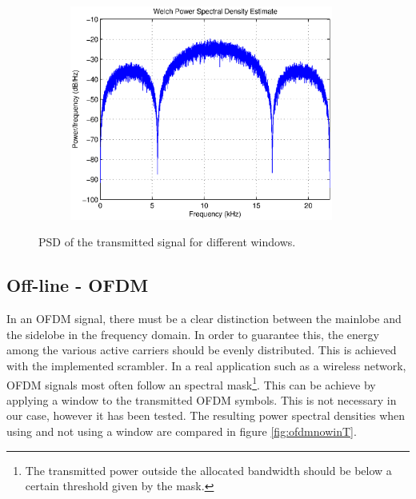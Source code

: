 \documentclass[12pt,a4paper,openright]{report}
\begin{document}
\begin{figure}[H]
\begin{subfigure}[H]{0.33\textwidth}
	    \includegraphics[width=0.95\textwidth]{psdrect.eps}
	    \label{fig:rect}
	    \end{subfigure}
	    \caption[Complex Baseband Pulse Shaping]{PSD of the transmitted signal for different windows.}
	\end{figure}

\subsection{Off-line - OFDM}

In an OFDM signal, there must be a clear distinction between the mainlobe and the sidelobe in the frequency domain. In order to guarantee this, the energy  among the various active carriers should be evenly distributed. This is achieved with the implemented scrambler. In a real application such as a wireless network, OFDM signals most often follow an spectral mask\footnote{The transmitted power outside the allocated bandwidth should be below a certain threshold given by the mask.}. This can be achieve by applying a window to the transmitted OFDM symbols. This is not necessary in our case, however it has been tested. The resulting power spectral densities when using and not using a window are compared in figure \ref{fig:ofdmnowinT}.
\end{document}
